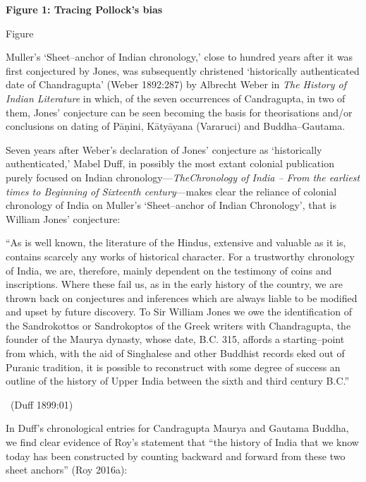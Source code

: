 \textbf{Figure 1: Tracing Pollock’s bias}

\begin{center}
Figure
\end{center}

Muller’s ‘Sheet–anchor of Indian chronology,’ close to hundred years after it was first conjectured by Jones, was subsequently christened ‘historically authenticated date of Chandragupta’ (Weber 1892:287) by Albrecht Weber in \textit{The History of Indian Literature} in which, of the seven occurrences of Candragupta, in two of them, Jones’ conjecture can be seen becoming the basis for theorisations and/or conclusions on dating of Pāṇini, Kātyāyana (Vararuci) and Buddha–Gautama.

Seven years after Weber’s declaration of Jones’ conjecture as ‘historically authenticated,’ Mabel Duff, in possibly the most extant colonial publication purely focused on Indian chronology—\textit{The}\textit{Chronology of India – From the earliest times to Beginning of Sixteenth century}—makes clear the reliance of colonial chronology of India on Muller’s ‘Sheet–anchor of Indian Chronology’, that is William Jones’ conjecture:

\begin{myquote}
“As is well known, the literature of the Hindus, extensive and valuable as it is, contains scarcely any works of historical character. For a trustworthy chronology of India, we are, therefore, mainly dependent on the testimony of coins and inscriptions. Where these fail us, as in the early history of the country, we are thrown back on conjectures and inferences which are always liable to be modified and upset by future discovery. To Sir William Jones we owe the identification of the Sandrokottos or Sandrokoptos of the Greek writers with Chandragupta, the founder of the Maurya dynasty, whose date, B.C. 315, affords a starting–point from which, with the aid of Singhalese and other Buddhist records eked out of Puranic tradition, it is possible to reconstruct with some degree of success an outline of the history of Upper India between the sixth and third century B.C.” 

~\hfill (Duff 1899:01)
\end{myquote}

In Duff’s chronological entries for Candragupta Maurya and Gautama Buddha, we find clear evidence of Roy’s statement that “the history of India that we know today has been constructed by counting backward and forward from these two sheet anchors” (Roy 2016a):

